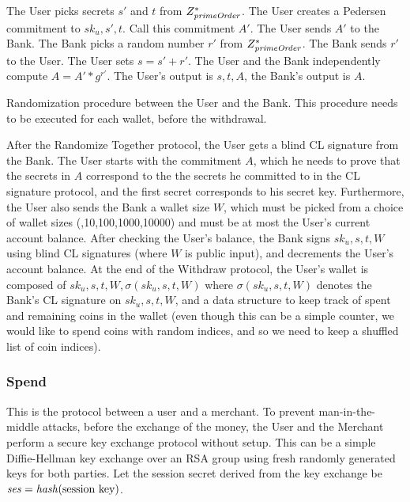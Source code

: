 \begin{algorithm}[H]\label{randomizeTogether}
\dontprintsemicolon

\BlankLine

 \;
\Indp
  The User picks secrets $s'$ and $t$ from $Z_{\mathit{primeOrder}}^*$. \;
  The User creates a Pedersen commitment to $sk_u, s', t$. Call this commitment $A'$. The User sends $A'$ to the Bank. \;
  The Bank picks a random number $r'$ from $Z_{\mathit{primeOrder}}^*$. The Bank sends $r'$ to the User. \;
  The User sets $ s = s' + r' $. The User and the Bank independently compute $ A = A' * g^{r'} $. \;
  The User's output is $s,t,A$, the Bank's output is $A$. \;
\Indm

\caption{Randomization procedure between the User and the Bank. This procedure needs to be executed for each wallet, before the withdrawal.}
\end{algorithm}

After the Randomize Together protocol, the User gets a blind CL signature from the Bank. The User starts with the commitment $A$, which he needs to prove that the secrets in $A$ correspond to the the secrets he committed to in the CL signature protocol, and the first secret corresponds to his secret key. Furthermore, the User also sends the Bank a wallet size $W$, which must be picked from a choice of wallet sizes (,10,100,1000,10000) and must be at most the User's current account balance. After checking the User's balance, the Bank signs $sk_u,s,t,W$ using blind CL signatures (where $W$ is public input), and decrements the User's account balance. At the end of the Withdraw protocol, the User's wallet is composed of $sk_u,s,t,W,\sigma(sk_u,s,t,W)$ where $\sigma(sk_u,s,t,W)$ denotes the Bank's CL signature on $sk_u,s,t,W$, and a data structure to keep track of spent and remaining coins in the wallet (even though this can be a simple counter, we would like to spend coins with random indices, and so we need to keep a shuffled list of coin indices).



\subsubsection{Spend}
This is the protocol between a user and a merchant. To prevent man-in-the-middle attacks, before the exchange of the money, the User and the Merchant perform a secure key exchange protocol without setup. This can be a simple Diffie-Hellman key exchange over an RSA group using fresh randomly generated keys for both parties. Let the session secret derived from the key exchange be $\mathit{ses} = \mathit{hash}(\text{session key})$.

